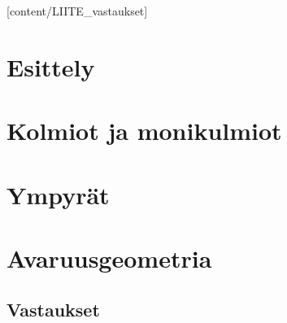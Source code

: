 [content/LIITE_vastaukset]

\chapter{Esittely}
    \newpage  %

\chapter{Kolmiot ja monikulmiot} %
    
    \newpage 
    \newpage 
    \newpage 
    \newpage 
    \newpage 
    \newpage 
    \newpage 

\chapter{Ympyrät}
    \newpage 
    \newpage 
    \newpage 

\chapter{Avaruusgeometria}
    \newpage 


\liitetyyli

\section{Vastaukset}

